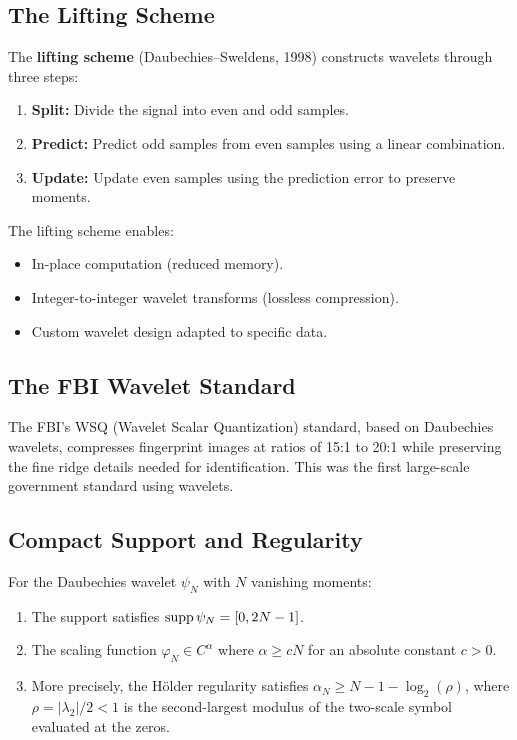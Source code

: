 \subsection{The Lifting Scheme}

\begin{definition}
The \textbf{lifting scheme} (Daubechies--Sweldens, 1998) constructs wavelets through three steps:
\begin{enumerate}
    \item \textbf{Split:} Divide the signal into even and odd samples.
    \item \textbf{Predict:} Predict odd samples from even samples using a linear combination.
    \item \textbf{Update:} Update even samples using the prediction error to preserve moments.
\end{enumerate}
\end{definition}

The lifting scheme enables:
\begin{itemize}
    \item In-place computation (reduced memory).
    \item Integer-to-integer wavelet transforms (lossless compression).
    \item Custom wavelet design adapted to specific data.
\end{itemize}

\subsection{The FBI Wavelet Standard}

The FBI's WSQ (Wavelet Scalar Quantization) standard, based on Daubechies wavelets, compresses fingerprint images at ratios of 15:1 to 20:1 while preserving the fine ridge details needed for identification. This was the first large-scale government standard using wavelets.

\subsection{Compact Support and Regularity}

\begin{theorem}[Daubechies, 1988]
\label{thm:daubechies_regularity}
For the Daubechies wavelet $\psi_N$ with $N$ vanishing moments:
\begin{enumerate}
    \item The support satisfies $\operatorname{supp} \psi_N = [0, 2N-1]$.
    \item The scaling function $\varphi_N \in C^{\alpha}$ where $\alpha \geq cN$ for an absolute constant $c > 0$.
    \item More precisely, the H\"older regularity satisfies $\alpha_N \geq N - 1 - \log_2(\rho)$, where $\rho = |\lambda_2| / 2 < 1$ is the second-largest modulus of the two-scale symbol evaluated at the zeros.
\end{enumerate}
\end{theorem}

